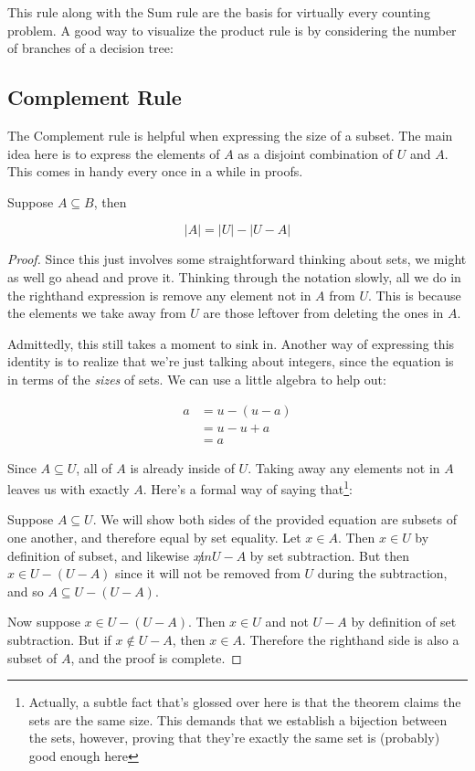 \documentclass{standlone}
\begin{document}
This rule along with the Sum rule are the basis for virtually every counting
problem. A good way to visualize the product rule is by considering the number
of branches of a decision tree:


\subsection{Complement Rule}

The Complement rule is helpful when expressing the size of a subset. The main
idea here is to express the elements of $A$ as a disjoint combination of $U$
and $A$. This comes in handy every once in a while in proofs.

\begin{theorem}
  Suppose $A \subseteq B$, then

  \[
    |A| = |U| - |U - A|
  \]
\end{theorem}

\begin{proof}
  Since this just involves some straightforward thinking about sets, we might
  as well go ahead and prove it. Thinking through the notation slowly, all we
  do in the righthand expression is remove any element not in $A$ from $U$.
  This is because the elements we take away from $U$ are those leftover from
  deleting the ones in $A$.


  Admittedly, this still takes a moment to sink in. Another way of expressing
  this identity is to realize that we're just talking about integers, since the
  equation is in terms of the \emph{sizes} of sets. We can use a little algebra
  to help out:

  \begin{align*}
    a
    &= u - (u - a) \\
    &= u - u + a \\
    &= a
  \end{align*}

  Since $A \subseteq U$, all of $A$ is already inside of $U$. Taking away any
  elements not in $A$ leaves us with exactly $A$. Here's a formal way of saying
  that\footnote{Actually, a subtle fact that's glossed over here is that the
  theorem claims the sets are the same size. This demands that we establish a
  bijection between the sets, however, proving that they're exactly the same
  set is (probably) good enough here}:

  Suppose $A \subseteq U$. We will show both sides of the provided equation are
  subsets of one another, and therefore equal by set equality. Let $x \in A$.
  Then $x \in U$ by definition of subset, and likewise $x \not in U - A$ by set
  subtraction. But then $x \in U - (U - A)$ since it will not be removed from
  $U$ during the subtraction, and so $A \subseteq U - (U - A)$.

  Now suppose $x \in U - (U - A)$. Then $x \in U$ and not $U - A$ by definition
  of set subtraction. But if $x \not \in U - A$, then $x \in A$. Therefore the
  righthand side is also a subset of $A$, and the proof is complete.
\end{proof}
\end{document}
